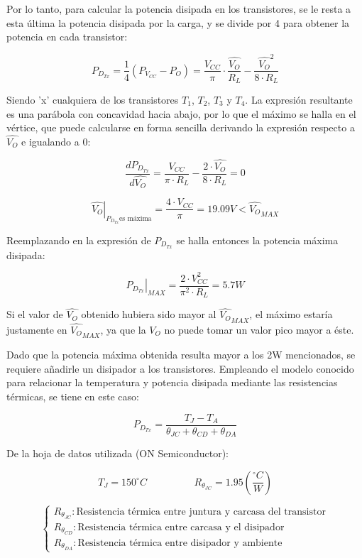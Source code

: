 Por lo tanto, para calcular la potencia disipada en los transistores, se le resta a esta última la potencia disipada por la carga, y se divide por 4 para obtener la potencia en cada transistor:

\[
P_{D_{Tx}} = \frac{1}{4} ( P_{V_{CC}} - P_O ) =  \frac{V_{CC}}{\pi} \cdot \frac{\hat{V_O}}{R_L} - \frac{\hat{V_O}^2}{8 \cdot R_L}
\]

Siendo 'x' cualquiera de los transistores $T_1$, $T_2$, $T_3$ y $T_4$. La expresión resultante es una parábola con concavidad hacia abajo, por lo que el máximo se halla en el vértice, que puede calcularse en forma sencilla derivando la expresión respecto a $\hat{V_O}$ e igualando a 0:

\[
\frac{dP_{D_{Tx}}}{d\hat{V_O}} = \frac{V_{CC}}{\pi \cdot R_L} - \frac{2 \cdot \hat{V_O}}{8 \cdot R_L} = 0
\]

\[
\left. \hat{V_O} \right|_{P_{D_{Tx}}\textrm{es máxima}} = \frac{4 \cdot V_{CC}}{\pi} = 19.09V < \hat{V_O}_{MAX}
\]

Reemplazando en la expresión de $P_{D_{Tx}}$ se halla entonces la potencia máxima disipada:

\[
\left. P_{D_{Tx}} \right|_{MAX} = \frac{2 \cdot V_{CC}^2}{\pi^2 \cdot R_L} = 5.7W
\]

Si el valor de $\hat{V_O}$ obtenido hubiera sido mayor al $\hat{V_O}_{MAX}$, el máximo estaría justamente en $\hat{V_O}_{MAX}$, ya que la $V_O$ no puede tomar un valor pico mayor a éste.\par
Dado que la potencia máxima obtenida resulta mayor a los 2W mencionados, se requiere añadirle un disipador a los transistores. Empleando el modelo conocido para relacionar la temperatura y potencia disipada mediante las resistencias térmicas, se tiene en este caso:

\[
P_{D_{Tx}} = \frac{T_J - T_A}{\theta_{JC} + \theta_{CD} + \theta_{DA}}
\]

De la hoja de datos utilizada (ON Semiconductor):

\[
T_J = 150^{\circ}C \hspace{2cm} R_{\theta_{JC}} = 1.95 \left(\frac{^{\circ}C}{W}\right)
\] 
 
\[
\left\lbrace
\begin{array}{l}
R_{\theta_{JC}}: \textrm{Resistencia t\'ermica entre juntura y carcasa del transistor} \\
R_{\theta_{CD}}: \textrm{Resistencia t\'ermica entre carcasa y el disipador} \\
R_{\theta_{DA}}: \textrm{Resistencia t\'ermica entre disipador y ambiente}
\end{array}
\right.
\] 

